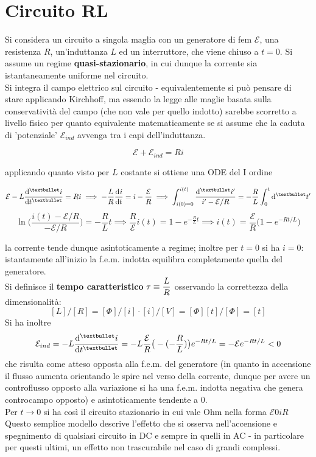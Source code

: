 \section{Circuito RL}
Si considera un circuito a singola maglia con un generatore di fem $\mathcal{E}$, una resistenza $R$, un'induttanza $L$ ed un interruttore, che viene chiuso a $t = 0$. Si assume un regime \textbf{quasi-stazionario}, in cui dunque la corrente sia istantaneamente uniforme nel circuito.
\\Si integra il campo elettrico sul circuito - equivalentemente si può pensare di stare applicando Kirchhoff, ma essendo la legge alle maglie basata sulla conservatività del campo (che non vale per quello indotto) sarebbe scorretto a livello fisico per quanto equivalente matematicamente se si assume che la caduta di 'potenziale' $\mathcal{E}_{ind}$ avvenga tra i capi dell'induttanza. 

\[\mathcal{E} + \mathcal{E}_{ind} = R i\]

applicando quanto visto per $L$ costante si ottiene una ODE del I ordine

\[\mathcal{E} - L \dv[•]{i}{t} = R i \implies - \frac{L}{R} \dv[]{i}{t} = i - \frac{\mathcal{E}}{R} \implies \int_{i(0) = 0}^{i(t)} \frac{\dd[•]{i'}}{i' - \mathcal{E}/R} = - \frac{R}{L} \int_0^t \dd[•]{t'}\]
\[\ln \bigg( \frac{i(t) - \mathcal{E}/R}{- \mathcal{E}/R} \bigg) = - \frac{R}{L} t \implies \frac{R}{\mathcal{E}} i(t) = 1 - e^{- \frac{R}{L} t} \implies i(t) = \frac{\mathcal{E}}{R}\big(1 - e^{-Rt/L}\big)\]

la corrente tende dunque asintoticamente a regime; inoltre per $t = 0$ si ha $i = 0$: istantamente all'inizio la f.e.m. indotta equilibra completamente quella del generatore.
\\Si definisce il \textbf{tempo caratteristico} $\displaystyle \tau \equiv \frac{L}{R}$ osservando la correttezza della dimensionalità:
\[[L]/[R] = [\Phi]/[i] \cdot [i]/[V] = [\Phi] [t] / [\Phi] = [t]\]
Si ha inoltre
\[\mathcal{E}_{ind} = - L \dv[•]{i}{t} = -L \frac{\mathcal{E}}{R} \big(- (- \frac{R}{L})\big) e^{-Rt/L} = - \mathcal{E} e^{-Rt/L} < 0\]
che risulta come atteso opposta alla f.e.m. del generatore (in quanto in accensione il flusso aumenta orientando le spire nel verso della corrente, dunque per avere un controflusso opposto alla variazione si ha una f.e.m. indotta negativa che genera controcampo opposto) e asintoticamente tendente a $0$.
\\Per $t \rightarrow 0$ si ha così il circuito stazionario in cui vale Ohm nella forma $\mathcal{E} 0 iR$
\\Questo semplice modello descrive l'effetto che si osserva nell'accensione e spegnimento di qualsiasi circuito in DC e sempre in quelli in AC - in particolare per questi ultimi, un effetto non trascurabile nel caso di grandi complessi.

